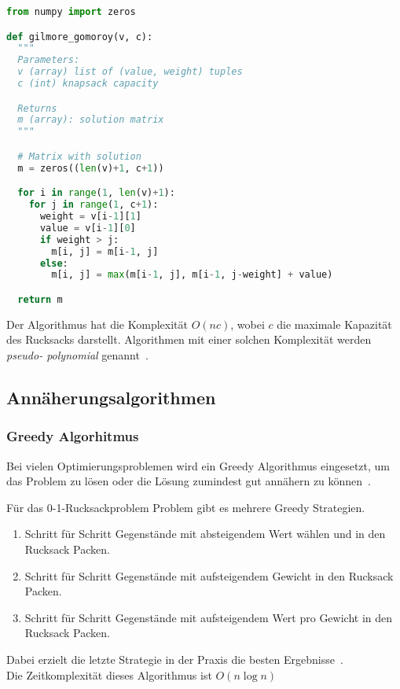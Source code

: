 \documentclass[12pt, a4paper, ngerman]{article}
\begin{document}
\begin{lstlisting}[language=Python,style=light,caption={Gilmore Gomoroy in Python}, label={lst:gg}]
from numpy import zeros

def gilmore_gomoroy(v, c):
  """
  Parameters: 
  v (array) list of (value, weight) tuples
  c (int) knapsack capacity

  Returns
  m (array): solution matrix
  """

  # Matrix with solution
  m = zeros((len(v)+1, c+1))

  for i in range(1, len(v)+1):
    for j in range(1, c+1):
      weight = v[i-1][1]
      value = v[i-1][0]
      if weight > j:
        m[i, j] = m[i-1, j]
      else:
        m[i, j] = max(m[i-1, j], m[i-1, j-weight] + value)

  return m
\end{lstlisting}

Der Algorithmus hat die Komplexität \(O(nc)\),
wobei \(c\) die maximale Kapazität des Rucksacks darstellt.
Algorithmen mit einer solchen Komplexität werden \emph{pseudo- polynomial} genannt~\cite{scheiterhauer2008}.

\subsection{Annäherungsalgorithmen}


\subsubsection{Greedy Algorhitmus}


Bei vielen Optimierungsproblemen wird ein Greedy Algorithmus eingesetzt,
um das Problem zu lösen oder die Lösung zumindest gut annähern zu können~\cite{paper102}.

Für das 0-1-Rucksackproblem Problem gibt es mehrere Greedy Strategien.

\begin{enumerate}
  \item Schritt für Schritt Gegenstände mit absteigendem Wert wählen und in den Rucksack Packen.
  \item Schritt für Schritt Gegenstände mit aufsteigendem Gewicht in den Rucksack Packen.
  \item Schritt für Schritt Gegenstände mit aufsteigendem Wert pro Gewicht in den Rucksack Packen.
\end{enumerate}

Dabei erzielt die letzte Strategie in der Praxis die besten Ergebnisse~\cite{paper102}.\\
Die Zeitkomplexität dieses Algorithmus ist \(O(n\log n)\)

\newpage
\printbibliography
\end{document}
